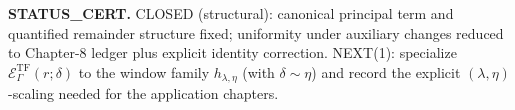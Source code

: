 \medskip
\noindent\textbf{STATUS\_CERT.}
CLOSED (structural): canonical principal term and quantified remainder structure fixed; uniformity under auxiliary changes reduced to
Chapter-8 ledger plus explicit identity correction.
NEXT(1): specialize $\mathcal E^{\mathrm{TF}}_\Gamma(r;\delta)$ to the window family $h_{\lambda,\eta}$ (with $\delta\sim\eta$)
and record the explicit $(\lambda,\eta)$-scaling needed for the application chapters.

